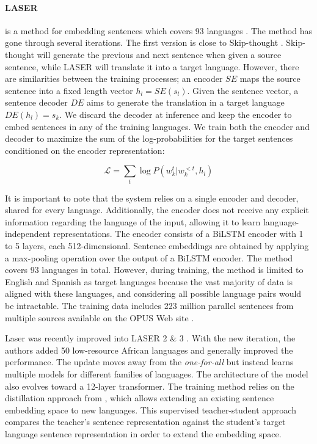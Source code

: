 \paragraph{LASER} is a method for embedding sentences which covers 93 languages \parencite{artetxe_19}. The method has gone through several iterations. The first version is close to Skip-thought \parencite{kiros_15}. Skip-thought will generate the previous and next sentence when given a source sentence, while LASER will translate it into a target language. However, there are similarities between the training processes; an encoder $SE$ maps the source sentence into a fixed length vector $h_l = SE(s_l)$. Given the sentence vector, a sentence decoder $DE$ aims to generate the translation in a target language $DE(h_l) = s_{k}$.  We discard the decoder at inference and keep the encoder to embed sentences in any of the training languages. We train both the encoder and decoder to maximize the sum of the log-probabilities for the target sentences conditioned on the encoder representation:

\begin{equation*}
    \mathcal{L} = \sum_t \log P(w_{k}^t | w_{k}^{<t}, h_l)
\end{equation*}

It is important to note that the system relies on a single encoder and decoder, shared for every language. Additionally, the encoder does not receive any explicit information regarding the language of the input, allowing it to learn language-independent representations.  The encoder consists of a BiLSTM encoder with 1 to 5 layers, each 512-dimensional. Sentence embeddings are obtained by applying a max-pooling operation over the output of a BiLSTM encoder. The method covers 93 languages in total. However, during training, the method is limited to English and Spanish as target languages because the vast majority of data is aligned with these languages, and considering all possible language pairs would be intractable. The training data includes 223 million parallel sentences from multiple sources available on the OPUS Web site \parencite{tiedemann_12}.

Laser was recently improved into LASER 2 \& 3 \parencite{heffernan_22}. With the new iteration, the authors added 50 low-resource African languages and generally improved the performance.
The update moves away from the \textit{one-for-all} but instead learns multiple models for different families of languages. The architecture of the model also evolves toward a 12-layer transformer. The training method relies on the distillation approach from \textcite{reimers_20}, which allows extending an existing sentence embedding space to new languages. This supervised teacher-student approach compares the teacher's sentence representation against the student's target language sentence representation in order to extend the embedding space.

